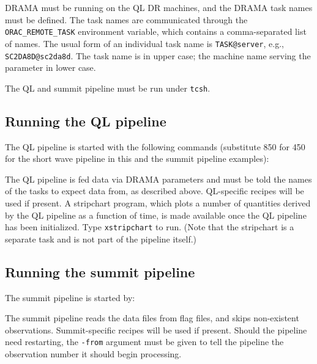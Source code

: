 \documentclass[twoside,11pt,nolof]{starlink}
\begin{document}
DRAMA must be running on the QL DR machines, and the DRAMA task names
must be defined. The task names are communicated through the
\verb+ORAC_REMOTE_TASK+ environment variable, which contains a
comma-separated list of names. The usual form of an individual task
name is \verb+TASK@server+, e.g., \verb+SC2DA8D@sc2da8d+. The task
name is in upper case; the machine name serving the parameter in lower
case.

The QL and summit pipeline must be run under \verb+tcsh+.

\subsection{Running the QL pipeline}

The QL pipeline is started with the following commands (substitute 850
for 450 for the short wave pipeline in this and the summit pipeline
examples):
\begin{terminalv}
\end{terminalv}
The QL pipeline is fed data via DRAMA parameters and must be told the
names of the tasks to expect data from, as described
above. QL-specific recipes will be used if present. A stripchart
program, which plots a number of quantities derived by the QL pipeline
as a function of time, is made available once the QL pipeline has been
initialized. Type \verb+xstripchart+ to run. (Note that the stripchart
is a separate task and is not part of the pipeline itself.)

\subsection{Running the summit pipeline}

The summit pipeline is started by:
\begin{terminalv}
\end{terminalv}
The summit pipeline reads the data files from flag files, and skips
non-existent observations. Summit-specific recipes will be used if
present. Should the pipeline need restarting, the \verb+-from+
argument must be given to tell the pipeline the observation number it
should begin processing.

\end{document}
